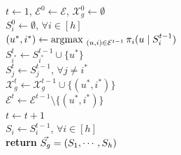 \begin{algorithm}[!h!]
 \caption{\CARM}
\label{alg:CA-EARM}
{\small
{}
} %
{\small
$t \leftarrow 1$, $\mathcal{E}^0 \leftarrow \mathcal{E}$, $\mathcal{X}_g^0 \leftarrow \emptyset$ \\
$S^0_i \leftarrow \emptyset$, $\forall i \in [h]$ \\
}
 {
$(u^*,i^*) \leftarrow \operatorname*{\arg\!\max~}_{(u,i) \in \mathcal{E}^{t-1}}  \pi_i(u \mid S^{t-1}_i)$ \\ \label{line:greedyCriteria}
 {
			$S_{i^*}^{t} \leftarrow S_{i^*}^{t-1} \cup \{ u^*\} $ \\
			$S_j^t \leftarrow S_j^{t-1}$, $\forall j \neq i^*$ \\
			$\mathcal{X}_g^{t} \leftarrow \mathcal{X}_g^{t-1} \cup \{(u^*, i^*)\}$ \\
			$\mathcal{E}^t \leftarrow \mathcal{E}^{t-1} \setminus \{(u^*, i^*)\}$ \\
			$t \leftarrow t + 1$ \\
}
}
$S_i \leftarrow S^{t-1}_i$, $\forall i \in [h]$ \\
{\bf return} $\vec{S_g} = (S_1, \cdots, S_h)$
\end{algorithm}

